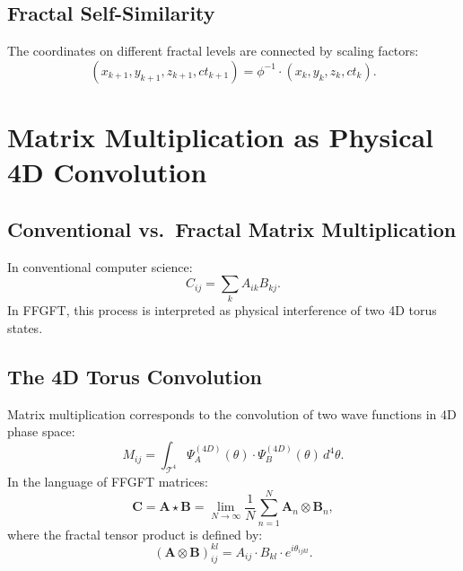 \subsection{Fractal Self-Similarity}

The coordinates on different fractal levels are connected by scaling
factors:
\begin{equation}
  (x_{k+1}, y_{k+1}, z_{k+1}, ct_{k+1}) = \phi^{-1} \cdot
  (x_k, y_k, z_k, ct_k).
\end{equation}

\section{Matrix Multiplication as Physical 4D Convolution}

\subsection{Conventional vs.\ Fractal Matrix Multiplication}

In conventional computer science:
\begin{equation}
  C_{ij} = \sum_k A_{ik} B_{kj}.
\end{equation}
In FFGFT, this process is interpreted as physical interference of two
4D torus states.

\subsection{The 4D Torus Convolution}

Matrix multiplication corresponds to the convolution of two wave functions
in 4D phase space:
\begin{equation}
  M_{ij} = \int_{\mathcal{T}^4}
    \Psi_A^{(4D)}(\theta)\cdot\Psi_B^{(4D)}(\theta)\,d^4\theta.
\end{equation}
In the language of FFGFT matrices:
\begin{equation}
  \mathbf{C} = \mathbf{A} \star \mathbf{B}
  = \lim_{N\to\infty} \frac{1}{N}\sum_{n=1}^{N} \mathbf{A}_n \otimes \mathbf{B}_n,
\end{equation}
where the fractal tensor product is defined by:
\begin{equation}
  (\mathbf{A} \otimes \mathbf{B})_{ij}^{kl}
  = A_{ij} \cdot B_{kl} \cdot e^{i\theta_{ijkl}}.
\end{equation}


